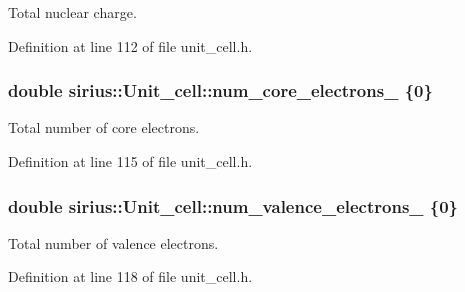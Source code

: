 Total nuclear charge. 



Definition at line 112 of file unit\+\_\+cell.\+h.

\hypertarget{classsirius_1_1_unit__cell_ac618473d45a36ccca6be2b6bfd27a5de}{}
\subsubsection[{num\+\_\+core\+\_\+electrons\+\_\+}]{\setlength{\rightskip}{0pt plus 5cm}double sirius\+::\+Unit\+\_\+cell\+::num\+\_\+core\+\_\+electrons\+\_\+ \{0\}\hspace{0.3cm}{\ttfamily [private]}}\label{classsirius_1_1_unit__cell_ac618473d45a36ccca6be2b6bfd27a5de}


Total number of core electrons. 



Definition at line 115 of file unit\+\_\+cell.\+h.

\hypertarget{classsirius_1_1_unit__cell_abd38f81cdedf2bad43dd2746bb866e0e}{}
\subsubsection[{num\+\_\+valence\+\_\+electrons\+\_\+}]{\setlength{\rightskip}{0pt plus 5cm}double sirius\+::\+Unit\+\_\+cell\+::num\+\_\+valence\+\_\+electrons\+\_\+ \{0\}\hspace{0.3cm}{\ttfamily [private]}}\label{classsirius_1_1_unit__cell_abd38f81cdedf2bad43dd2746bb866e0e}


Total number of valence electrons. 



Definition at line 118 of file unit\+\_\+cell.\+h.

\hypertarget{classsirius_1_1_unit__cell_acf4750818ca4a8f1bae847a34879d16e}{}
